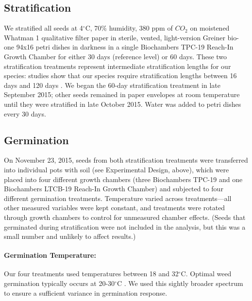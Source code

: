 \documentclass[11pt]{article}\usepackage[]{graphicx}\usepackage[]{color}
\begin{document}
	\subsection{Stratification} 
	We stratified all seeds at 4$^\circ$C, 70\% humidity, 380 ppm of $CO_2$ \parencite[e.g.,][]{Meekins1999,Popay1970} on moistened Whatman 1 qualitative filter paper in sterile, vented, light-version Greiner bio-one 94x16 petri dishes in darkness \parencite{Baskin1998,Popay1970} in a single Biochambers TPC-19 Reach-In Growth Chamber for either 30 days (reference level) or 60 days. These two stratification treatments represent intermediate stratification lengths for our species: studies show that our species require stratification lengths between 16 days \parencite{Popay1970} and 120 days \parencite{Meekins1999}. We began the 60-day stratification treatment in late September 2015; other seeds remained in paper envelopes at room temperature until they were stratified in late October 2015.  Water was added to petri dishes every 30 days.
	
	\subsection{Germination}
	On November 23, 2015, seeds from both stratification treatments were transferred into individual pots with soil (see Experimental Design, above), which were placed into four different growth chambers (three Biochambers TPC-19 and one Biochambers LTCB-19 Reach-In Growth Chamber) and subjected to four different germination treatments. Temperature varied across treatments---all other measured variables were kept constant, and treatments were rotated through growth chambers to control for unmeasured chamber effects. (Seeds that germinated during stratification were not included in the analysis, but this was a small number and unlikely to affect results.)
	
	\paragraph{Germination Temperature:} Our four treatments used temperatures between 18 and 32$^\circ$C. Optimal weed germination typically occurs at 20-30$^\circ$C \parencite{Hartmann2010,Steinbauer1957,Wulff1994,Popay1970}. We used this  sightly broader spectrum to ensure a sufficient variance in germination response.
	
\end{document}
